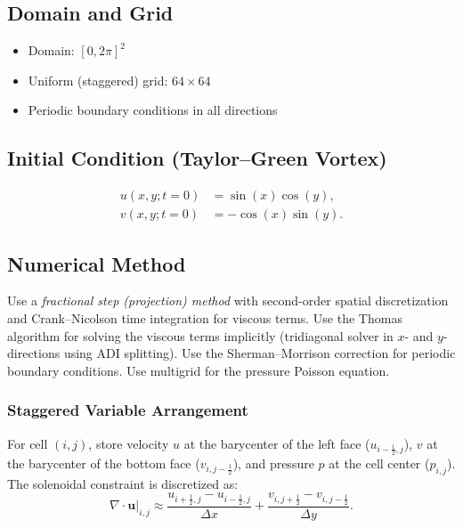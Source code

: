 \subsection*{Domain and Grid}

\begin{itemize}
  \item Domain: $[0, 2\pi]^2$
  \item Uniform (staggered) grid: $64 \times 64$
  \item Periodic boundary conditions in all directions
\end{itemize}

\subsection*{Initial Condition (Taylor--Green Vortex)}

\begin{align}
  u(x,y; t=0) &= \sin(x)\cos(y), \label{eq:ic_u} \\
  v(x,y; t=0) &= -\cos(x)\sin(y). \label{eq:ic_v}
\end{align}

\subsection*{Numerical Method}

Use a \emph{fractional step (projection) method} with second-order spatial discretization and Crank--Nicolson time integration for viscous terms. Use the Thomas algorithm for solving the viscous terms implicitly (tridiagonal solver in $x$- and $y$-directions using ADI splitting). Use the Sherman--Morrison correction for periodic boundary conditions. Use multigrid for the pressure Poisson equation.

\subsubsection*{Staggered Variable Arrangement}

For cell $(i,j)$, store velocity $u$ at the barycenter of the left face ($u_{i-\frac{1}{2},j}$), $v$ at the barycenter of the bottom face ($v_{i,j-\frac{1}{2}}$), and pressure $p$ at the cell center ($p_{i,j}$). The solenoidal constraint is discretized as:
\begin{equation}
  \nabla \cdot \mathbf{u}\big|_{i,j} \approx \frac{u_{i+\frac{1}{2},j} - u_{i-\frac{1}{2},j}}{\Delta x} + \frac{v_{i,j+\frac{1}{2}} - v_{i,j-\frac{1}{2}}}{\Delta y}. \label{eq:div}
\end{equation}


